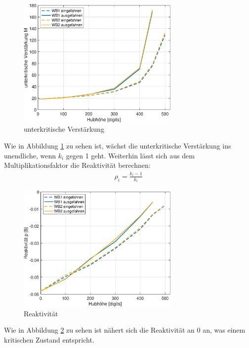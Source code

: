 \documentclass[12pt,german]{article}
\begin{document}
    \begin{figure}[H]
        \centering
        \includegraphics[width=0.7\textwidth]{unterkritischeVerstaerkung.eps}
        \caption{unterkritische Verstärkung}
        \label{fig:unterkritVerst}
    \end{figure}
    Wie in Abbildung \ref{fig:unterkritVerst} zu sehen ist, wächst die unterkritische Verstärkung ins unendliche, wenn $k_i$ gegen 1 geht.
    \newpage
    Weiterhin lässt sich aus dem Multiplikationsfaktor die Reaktivität berechnen:
    \begin{align*}
        \rho_i = \frac{k_i - 1}{k_i}
    \end{align*}

    \begin{figure}[H]
        \centering
        \includegraphics[width=0.7\textwidth]{reaktivitaet.eps}
        \caption{Reaktivität}
        \label{fig:reaktivitaet}
    \end{figure}
    Wie in Abbildung \ref{fig:reaktivitaet} zu sehen ist nähert sich die Reaktivität an 0 an, was einem kritischen Zustand entspricht.
\end{document}
